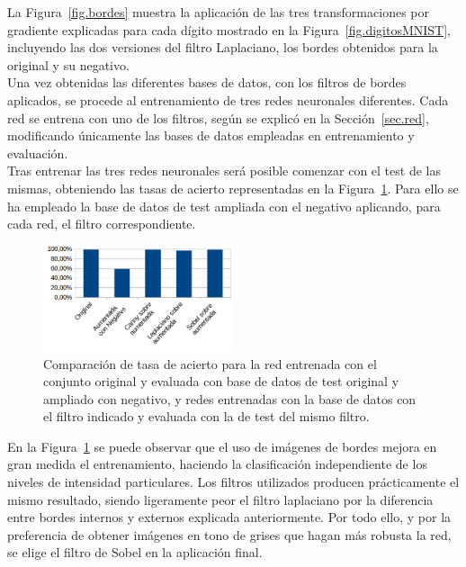 La Figura~\ref{fig.bordes} muestra la aplicación de las tres transformaciones por gradiente explicadas para cada dígito mostrado en la Figura~\ref{fig.digitosMNIST}, incluyendo las dos versiones del filtro Laplaciano, los bordes obtenidos para la original y su negativo.\\

Una vez obtenidas las diferentes bases de datos, con los filtros de bordes aplicados, se procede al entrenamiento de tres redes neuronales diferentes. Cada red se entrena con uno de los filtros, según se explicó en la Sección~\ref{sec.red}, modificando únicamente las bases de datos empleadas en entrenamiento y evaluación.\\

Tras entrenar las tres redes neuronales será posible comenzar con el test de las mismas, obteniendo las tasas de acierto representadas en la Figura~\ref{fig.filtros}. Para ello se ha empleado la base de datos de test ampliada con el negativo aplicando, para cada red, el filtro correspondiente.

\begin{figure}[H]
	\begin{center}
		\includegraphics[width=0.5\textwidth]{figures/filtros}
		\caption{Comparación de tasa de acierto para la red entrenada con el conjunto original y evaluada con base de datos de test original y ampliado con negativo, y redes entrenadas con la base de datos con el filtro indicado y evaluada con la de test del mismo filtro.}
		\label{fig.filtros}
	\end{center}
\end{figure}

En la Figura~\ref{fig.filtros} se puede observar que el uso de imágenes de bordes mejora en gran medida el entrenamiento, haciendo la clasificación independiente de los niveles de intensidad particulares. Los filtros utilizados producen prácticamente el mismo resultado, siendo ligeramente peor el filtro laplaciano por la diferencia entre bordes internos y externos explicada anteriormente. Por todo ello, y por la preferencia de obtener imágenes en tono de grises que hagan más robusta la red, se elige el filtro de Sobel en la aplicación final.

